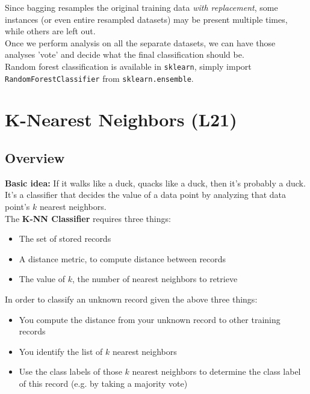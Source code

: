 \documentclass[english, 10pt]{article}
\begin{document}
\hfill \break Since bagging resamples the original training data \textit{with replacement}, some instances (or even entire resampled datasets) may be present multiple times, while others are left out.\\

Once we perform analysis on all the separate datasets, we can have those analyses 'vote' and decide what the final classification should be.\\

Random forest classification is available in \texttt{sklearn}, simply import \texttt{RandomForestClassifier} from \texttt{sklearn.ensemble}.

\section{K-Nearest Neighbors (L21)}

\subsection{Overview}

\textbf{Basic idea:} If it walks like a duck, quacks like a duck, then it's probably a duck.\\

It's a classifier that decides the value of a data point by analyzing that data point's $k$ nearest neighbors.\\

The \textbf{K-NN Classifier} requires three things:
\begin{itemize}
	\item The set of stored records
	\item A distance metric, to compute distance between records
	\item The value of $k$, the number of nearest neighbors to retrieve
\end{itemize}

In order to classify an unknown record given the above three things:

\begin{itemize}
	\item You compute the distance from your unknown record to other training records
	\item You identify the list of $k$ nearest neighbors
	\item Use the class labels of those $k$ nearest neighbors to determine the class label of this record (e.g. by taking a majority vote)
\end{itemize}
\end{document}
